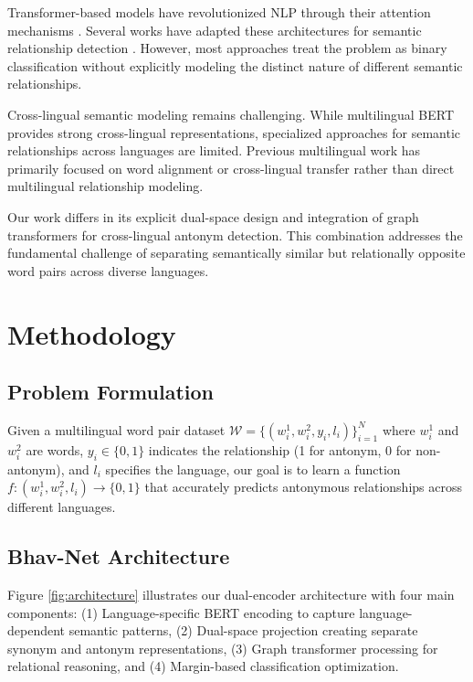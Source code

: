 \documentclass[11pt]{article}
\begin{document}
Transformer-based models have revolutionized NLP through their attention mechanisms \cite{vaswani2017attention,devlin2018bert}. Several works have adapted these architectures for semantic relationship detection \cite{rogers2020primer,liu2019roberta}. However, most approaches treat the problem as binary classification without explicitly modeling the distinct nature of different semantic relationships.

Cross-lingual semantic modeling remains challenging. While multilingual BERT \cite{devlin2018bert} provides strong cross-lingual representations, specialized approaches for semantic relationships across languages are limited. Previous multilingual work has primarily focused on word alignment \cite{chen2020multi} or cross-lingual transfer \cite{ruder2019survey} rather than direct multilingual relationship modeling.

Our work differs in its explicit dual-space design and integration of graph transformers for cross-lingual antonym detection. This combination addresses the fundamental challenge of separating semantically similar but relationally opposite word pairs across diverse languages.

\section{Methodology}

\subsection{Problem Formulation}
Given a multilingual word pair dataset $\mathcal{W} = \{(w_i^1, w_i^2, y_i, l_i)\}_{i=1}^N$ where $w_i^1$ and $w_i^2$ are words, $y_i \in \{0, 1\}$ indicates the relationship (1 for antonym, 0 for non-antonym), and $l_i$ specifies the language, our goal is to learn a function $f: (w_i^1, w_i^2, l_i) \rightarrow \{0, 1\}$ that accurately predicts antonymous relationships across different languages.

\subsection{Bhav-Net Architecture}

Figure \ref{fig:architecture} illustrates our dual-encoder architecture with four main components: (1) Language-specific BERT encoding to capture language-dependent semantic patterns, (2) Dual-space projection creating separate synonym and antonym representations, (3) Graph transformer processing for relational reasoning, and (4) Margin-based classification optimization.
\end{document}
